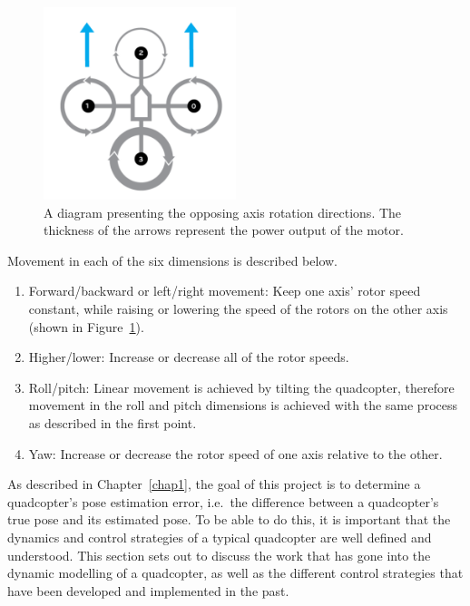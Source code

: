 \begin{figure}
  \centering
  \includegraphics[width=0.5\textwidth]{figures/chapter2/quad_axis.pdf}
  \caption[Diagram presenting the opposing axis rotations directions.]{A diagram presenting the opposing axis rotation directions. The thickness of the arrows represent the power output of the motor.~\citep{quad-rotation-pic}}
\label{fig:chap2-quad-rotation}
\end{figure}

Movement in each of the six dimensions is described below. 

\begin{enumerate}
  \item Forward/backward or left/right movement: Keep one axis' rotor speed constant, while raising or lowering the speed of the rotors on the other axis (shown in Figure~\ref{fig:chap2-quad-rotation}).
  \item Higher/lower: Increase or decrease all of the rotor speeds.
  \item Roll/pitch: Linear movement is achieved by tilting the quadcopter, therefore movement in the roll and pitch dimensions is achieved with the same process as described in the first point. 
  \item Yaw: Increase or decrease the rotor speed of one axis relative to the other. 
\end{enumerate}

As described in Chapter~\ref{chap1}, the goal of this project is to determine a quadcopter's pose estimation error, i.e.\ the difference between a quadcopter's true pose and its estimated pose. To be able to do this, it is important that the dynamics and control strategies of a typical quadcopter are well defined and understood. This section sets out to discuss the work that has gone into the dynamic modelling of a quadcopter, as well as the different control strategies that have been developed and implemented in the past. 

